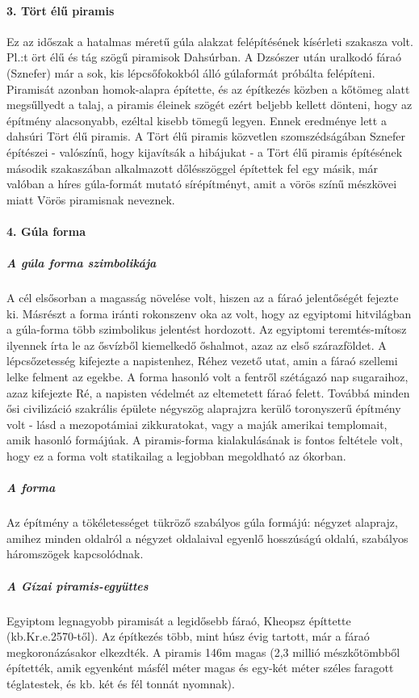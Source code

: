 \paragraph{3. Tört élű piramis}
Ez az időszak a hatalmas méretű gúla alakzat felépítésének kísérleti szakasza volt. Pl.:t ört élű és tág szögű piramisok Dahsúrban.
A Dzsószer után uralkodó fáraó (Sznefer) már a sok, kis lépcsőfokokból álló gúlaformát próbálta felépíteni. Piramisát azonban homok-alapra építette, és az építkezés közben a kőtömeg alatt megsűllyedt a talaj, a piramis éleinek szögét ezért beljebb kellett dönteni, hogy az építmény alacsonyabb, ezéltal kisebb tömegű legyen. Ennek eredménye lett a dahsúri Tört élű piramis.
A Tört élű piramis közvetlen szomszédságában Sznefer építészei - valószínű, hogy kijavítsák a hibájukat - a Tört élű piramis építésének második szakaszában alkalmazott dőlésszöggel építettek fel egy másik, már valóban a híres gúla-formát mutató sírépítményt, amit a vörös színű mészkövei miatt Vörös piramisnak neveznek.


\paragraph{4. Gúla forma}
\subparagraph{A gúla forma szimbolikája}
A cél elsősorban a magasság növelése volt, hiszen az a fáraó jelentőségét fejezte ki. Másrészt a forma iránti rokonszenv oka az volt, hogy az egyiptomi hitvilágban a gúla-forma több szimbolikus jelentést hordozott. Az egyiptomi teremtés-mítosz ilyennek írta le az ősvízből kiemelkedő őshalmot, azaz az első szárazföldet. A lépcsőzetesség kifejezte a napistenhez, Réhez vezető utat, amin a fáraó szellemi lelke felment az egekbe. A forma hasonló volt a fentről szétágazó nap sugaraihoz, azaz kifejezte Ré, a napisten védelmét az eltemetett fáraó felett. Továbbá minden ősi civilizáció szakrális épülete négyszög alaprajzra kerülő toronyszerű építmény volt - lásd a mezopotámiai zikkuratokat, vagy a maják amerikai templomait, amik hasonló formájúak. A piramis-forma kialakulásának is fontos feltétele volt, hogy ez a forma volt statikailag a legjobban megoldható az ókorban.

\subparagraph{A forma} Az építmény a tökéletességet tükröző szabályos gúla formájú: négyzet alaprajz, amihez minden oldalról a négyzet oldalaival egyenlő hosszúságú oldalú, szabályos háromszögek kapcsolódnak.

\subparagraph{A Gízai piramis-együttes}
Egyiptom legnagyobb piramisát a legidősebb fáraó, Kheopsz építtette (kb.Kr.e.2570-től). Az építkezés több, mint húsz évig tartott, már a fáraó megkoronázásakor elkezdték. A piramis 146m magas (2,3 millió mészkőtömbből építették, amik egyenként másfél méter magas és egy-két méter széles faragott téglatestek, és kb. két és fél tonnát nyomnak).

